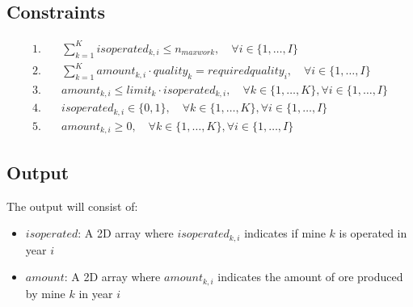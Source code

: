 \documentclass{article}
\begin{document}
\subsection*{Constraints}
\begin{align*}
1. & \quad \sum_{k=1}^{K} isoperated_{k,i} \leq n_{maxwork}, \quad \forall i \in \{1, \ldots, I\} \\
2. & \quad \sum_{k=1}^{K} amount_{k,i} \cdot quality_k = requiredquality_i, \quad \forall i \in \{1, \ldots, I\} \\
3. & \quad amount_{k,i} \leq limit_k \cdot isoperated_{k,i}, \quad \forall k \in \{1, \ldots, K\}, \forall i \in \{1, \ldots, I\} \\
4. & \quad isoperated_{k,i} \in \{0,1\}, \quad \forall k \in \{1, \ldots, K\}, \forall i \in \{1, \ldots, I\} \\
5. & \quad amount_{k,i} \geq 0, \quad \forall k \in \{1, \ldots, K\}, \forall i \in \{1, \ldots, I\}
\end{align*}

\subsection*{Output}
The output will consist of:
\begin{itemize}
    \item $isoperated$: A 2D array where $isoperated_{k,i}$ indicates if mine $k$ is operated in year $i$
    \item $amount$: A 2D array where $amount_{k,i}$ indicates the amount of ore produced by mine $k$ in year $i$
\end{itemize}
\end{document}
